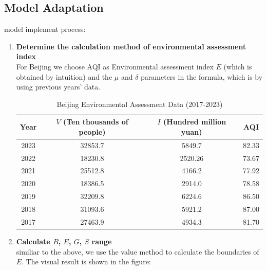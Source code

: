 \documentclass[UTF8]{mcmthesis}
\begin{document}
            \subsection{Model Adaptation}
            \hspace*{2em}model implement process:
            \begin{enumerate}
                \item \textbf{Determine the calculation method of environmental assessment index} \\
                \hspace*{2em}For Beijing we choose AQI as Environmental assessment index $E$ (which is obtained by intuition) and the $\mu$ and $\delta$ parameters in the formula, which is by using previous years' data.

                \begin{table}[htbp]
                    \centering
                    \caption{Beijing Environmental Assessment Data (2017-2023)}
                    \begin{tabular}{cccc}
                        \toprule
                        \textbf{Year} & \textbf{\( V \) (Ten thousands of people)} & \textbf{\( I \) (Hundred million yuan)} & \textbf{AQI} \\ 
                        \midrule
                        2023 & 32853.7 & 5849.7  & 82.33 \\ 
                        2022 & 18230.8 & 2520.26 & 73.67 \\ 
                        2021 & 25512.8 & 4166.2  & 77.92 \\ 
                        2020 & 18386.5 & 2914.0  & 78.58 \\ 
                        2019 & 32209.8 & 6224.6  & 86.50 \\ 
                        2018 & 31093.6 & 5921.2  & 87.00 \\ 
                        2017 & 27463.9 & 4934.3  & 81.70 \\ 
                        \bottomrule
                    \end{tabular}
                    \label{tab:beijing_env_data}
                \end{table}
                


                \item \textbf{Calculate $B$, $E$, $G$, $S$ range}
                \\ \hspace*{2em}similiar to the above, we use the value method to calculate the boundaries of $E$. The visual result is shown in the figure:


\end{enumerate}
\end{document}
